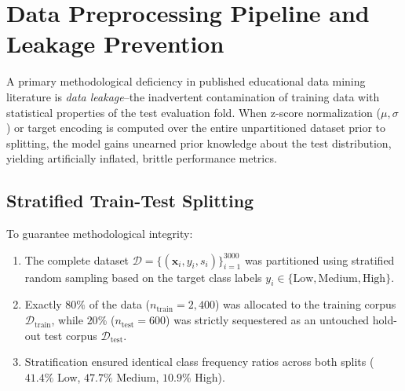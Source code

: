 \documentclass[12pt,a4paper,oneside]{report}
\begin{document}
\section{Data Preprocessing Pipeline and Leakage Prevention}
\label{sec:preprocessing_pipeline}
A primary methodological deficiency in published educational data mining literature is \emph{data leakage}--the inadvertent contamination of training data with statistical properties of the test evaluation fold. When z-score normalization ($\mu, \sigma$) or target encoding is computed over the entire unpartitioned dataset prior to splitting, the model gains unearned prior knowledge about the test distribution, yielding artificially inflated, brittle performance metrics.

\subsection{Stratified Train-Test Splitting}
To guarantee methodological integrity:
\begin{enumerate}
    \item The complete dataset $\mathcal{D} = \{(\mathbf{x}_i, y_i, s_i)\}_{i=1}^{3000}$ was partitioned using stratified random sampling based on the target class labels $y_i \in \{\text{Low}, \text{Medium}, \text{High}\}$.
    \item Exactly $80\%$ of the data ($n_{\text{train}} = 2,400$) was allocated to the training corpus $\mathcal{D}_{\text{train}}$, while $20\%$ ($n_{\text{test}} = 600$) was strictly sequestered as an untouched hold-out test corpus $\mathcal{D}_{\text{test}}$.
    \item Stratification ensured identical class frequency ratios across both splits ($41.4\%$ Low, $47.7\%$ Medium, $10.9\%$ High).
\end{enumerate}
\end{document}
